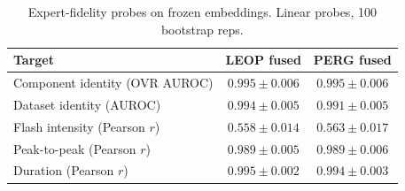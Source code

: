 \begin{table}[htbp]
\centering
\caption{Expert-fidelity probes on frozen embeddings. Linear probes, 100 bootstrap reps.}
\label{tab:probes}
\begin{tabular}{lcc}
\toprule
Target & LEOP fused & PERG fused \\
\midrule
Component identity (OVR AUROC) & $0.995 \pm 0.006$ & $0.995 \pm 0.006$ \\
Dataset identity (AUROC) & $0.994 \pm 0.005$ & $0.991 \pm 0.005$ \\
Flash intensity (Pearson $r$) & $0.558 \pm 0.014$ & $0.563 \pm 0.017$ \\
Peak-to-peak (Pearson $r$) & $0.989 \pm 0.005$ & $0.989 \pm 0.006$ \\
Duration (Pearson $r$) & $0.995 \pm 0.002$ & $0.994 \pm 0.003$ \\
\bottomrule
\end{tabular}
\end{table}
